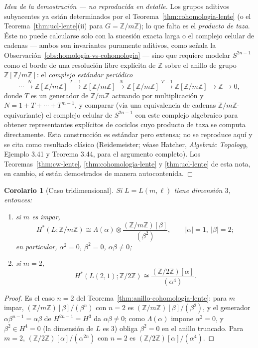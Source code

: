 \documentclass[11pt,a4paper]{article}
\theoremstyle{plain}
\newtheorem{corollary}[theorem]{Corolario}
\theoremstyle{definition}
\theoremstyle{remark}
\newcommand{\ZZ}{\mathbb Z}
\begin{document}
\begin{proof}[Idea de la demostración --- no reproducida en detalle]
Los grupos aditivos subyacentes ya están determinados por el
Teorema~\ref{thm:cohomologia-lente} (o el Teorema~\ref{thm:ucl-lente}(ii)
para $G=\ZZ/m\ZZ$); lo que falta es el \emph{producto de taza}. Éste no
puede calcularse solo con la sucesión exacta larga o el complejo
celular de cadenas --- ambos son invariantes puramente aditivos, como
señala la Observación~\ref{obs:homologia-vs-cohomologia} --- sino que
requiere modelar $S^{2n-1}$ como el borde de una resolución libre
explícita de $\ZZ$ sobre el anillo de grupo $\ZZ[\ZZ/m\ZZ]$: el
\emph{complejo estándar periódico}
\[
\cdots\xrightarrow{N}\ZZ[\ZZ/m\ZZ]\xrightarrow{T-1}\ZZ[\ZZ/m\ZZ]\xrightarrow{N}\ZZ[\ZZ/m\ZZ]\xrightarrow{T-1}\ZZ[\ZZ/m\ZZ]\to\ZZ\to0,
\]
donde $T$ es un generador de $\ZZ/m\ZZ$ actuando por multiplicación y
$N=1+T+\cdots+T^{m-1}$, y comparar (vía una equivalencia de cadenas
$\ZZ/m\ZZ$-equivariante) el complejo celular de $S^{2n-1}$ con este
complejo algebraico para obtener representantes explícitos de cociclos
cuyo producto de taza se computa directamente. Esta construcción es
estándar pero extensa; no se reproduce aquí y se cita como resultado
clásico (Reidemeister; véase Hatcher, \emph{Algebraic Topology}, Ejemplo
3.41 y Teorema 3.44, para el argumento completo). Los
Teoremas~\ref{thm:cw-lente}, \ref{thm:cohomologia-lente} y
\ref{thm:ucl-lente} de esta nota, en cambio, sí están demostrados de
manera autocontenida.
\end{proof}

\begin{corollary}[Caso tridimensional]
\label{cor:anillo-lente-3d}
Si $L=L(m,\ell)$ tiene dimensión $3$, entonces:
\begin{enumerate}[label=(\roman*)]
\item si $m$ es impar,
\[
H^*(L;\ZZ/m\ZZ)\cong\Lambda(\alpha)\otimes\frac{(\ZZ/m\ZZ)[\beta]}{(\beta^2)}, \qquad |\alpha|=1,\ |\beta|=2;
\]
en particular, $\alpha^2=0$, $\beta^2=0$, $\alpha\beta\ne0$;
\item si $m=2$,
\[
H^*(L(2,1);\ZZ/2\ZZ)\cong\frac{(\ZZ/2\ZZ)[\alpha]}{(\alpha^4)}.
\]
\end{enumerate}
\end{corollary}

\begin{proof}
Es el caso $n=2$ del Teorema~\ref{thm:anillo-cohomologia-lente}: para
$m$ impar, $(\ZZ/m\ZZ)[\beta]/(\beta^n)$ con $n=2$ es
$(\ZZ/m\ZZ)[\beta]/(\beta^2)$, y el generador $\alpha\beta^{n-1}=\alpha\beta$
de $H^{2n-1}=H^3$ da $\alpha\beta\ne0$; como $\Lambda(\alpha)$ impone
$\alpha^2=0$, y $\beta^2\in H^4=0$ (la dimensión de $L$ es $3$) obliga
$\beta^2=0$ en el anillo truncado. Para $m=2$, $(\ZZ/2\ZZ)[\alpha]/(\alpha^{2n})$
con $n=2$ es $(\ZZ/2\ZZ)[\alpha]/(\alpha^4)$.
\end{proof}
\end{document}
